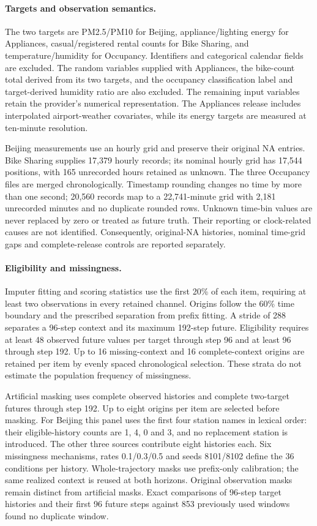 \paragraph{Targets and observation semantics.}
The two targets are PM2.5/PM10 for Beijing, appliance/lighting energy for Appliances, casual/registered rental counts for Bike Sharing, and temperature/humidity for Occupancy. Identifiers and categorical calendar fields are excluded. The random variables supplied with Appliances, the bike-count total derived from its two targets, and the occupancy classification label and target-derived humidity ratio are also excluded. The remaining input variables retain the provider's numerical representation. The Appliances release includes interpolated airport-weather covariates, while its energy targets are measured at ten-minute resolution.

Beijing measurements use an hourly grid and preserve their original NA entries. Bike Sharing supplies 17,379 hourly records; its nominal hourly grid has 17,544 positions, with 165 unrecorded hours retained as unknown. The three Occupancy files are merged chronologically. Timestamp rounding changes no time by more than one second; 20,560 records map to a 22,741-minute grid with 2,181 unrecorded minutes and no duplicate rounded rows. Unknown time-bin values are never replaced by zero or treated as future truth. Their reporting or clock-related causes are not identified. Consequently, original-NA histories, nominal time-grid gaps and complete-release controls are reported separately.

\paragraph{Eligibility and missingness.}
Imputer fitting and scoring statistics use the first 20\% of each item, requiring at least two observations in every retained channel. Origins follow the 60\% time boundary and the prescribed separation from prefix fitting. A stride of 288 separates a 96-step context and its maximum 192-step future. Eligibility requires at least 48 observed future values per target through step 96 and at least 96 through step 192. Up to 16 missing-context and 16 complete-context origins are retained per item by evenly spaced chronological selection. These strata do not estimate the population frequency of missingness.

Artificial masking uses complete observed histories and complete two-target futures through step 192. Up to eight origins per item are selected before masking. For Beijing this panel uses the first four station names in lexical order: their eligible-history counts are 1, 4, 0 and 3, and no replacement station is introduced. The other three sources contribute eight histories each. Six missingness mechanisms, rates 0.1/0.3/0.5 and seeds 8101/8102 define the 36 conditions per history. Whole-trajectory masks use prefix-only calibration; the same realized context is reused at both horizons. Original observation masks remain distinct from artificial masks. Exact comparisons of 96-step target histories and their first 96 future steps against 853 previously used windows found no duplicate window.

